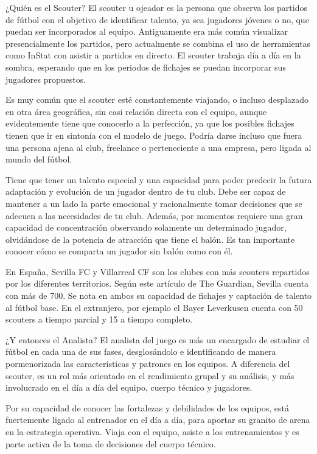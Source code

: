 ¿Quién es el Scouter?
El scouter u ojeador es la persona que observa los partidos de 
fútbol con el objetivo de identificar talento, ya sea jugadores 
jóvenes o no, que puedan ser incorporados al equipo. Antiguamente 
era más común visualizar presencialmente los partidos, pero 
actualmente se combina el uso de herramientas como InStat 
con asistir a partidos en directo. El scouter trabaja día a 
día en la sombra, esperando que en los periodos de fichajes 
se puedan incorporar sus jugadores propuestos.

Es muy común que el scouter esté constantemente viajando, o incluso 
desplazado en otra área geográfica, sin casi relación directa 
con el equipo, aunque evidentemente tiene que conocerlo a la 
perfección, ya que los posibles fichajes tienen que ir en 
sintonía con el modelo de juego. Podría darse incluso que fuera 
una persona ajena al club, freelance o perteneciente a una empresa, 
pero ligada al mundo del fútbol.

Tiene que tener un talento especial y una capacidad para poder 
predecir la futura adaptación y evolución de un jugador dentro 
de tu club. Debe ser capaz de mantener a un lado la parte emocional 
y racionalmente tomar decisiones que se adecuen a las necesidades 
de tu club. Además, por momentos requiere una gran capacidad de 
concentración observando solamente un determinado jugador, 
olvidándose de la potencia de atracción que tiene el balón. 
Es tan importante conocer cómo se comparta un jugador sin 
balón como con él.

En España, Sevilla FC y  Villarreal CF son los clubes con más 
scouters repartidos por los diferentes territorios. Según este 
artículo de The Guardian, Sevilla cuenta con más de 700. Se nota 
en ambos su capacidad de fichajes y captación de talento al fútbol 
base. En el extranjero, por ejemplo el Bayer Leverkusen cuenta 
con 50 scouters a tiempo parcial y 15 a tiempo completo.

¿Y entonces el Analista?
El analista del juego es más un encargado de estudiar el 
fútbol en cada una de sus fases, desglosándolo e identificando 
de manera pormenorizada las características y patrones en los 
equipos. A diferencia del scouter, es un rol más orientado 
en el rendimiento grupal y su análisis, y más involucrado 
en el día a día del equipo, cuerpo técnico y jugadores.

Por su capacidad de conocer las fortalezas y debilidades de 
los equipos, está fuertemente ligado al entrenador en el 
día a día, para aportar su granito de arena en la estrategia 
operativa. Viaja con el equipo, asiste a los entrenamientos 
y es parte activa de la toma de decisiones del cuerpo técnico.

